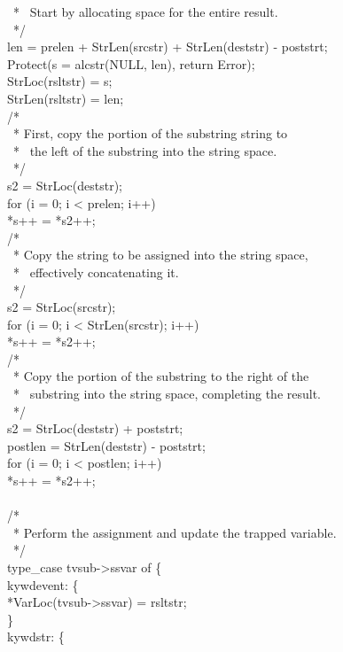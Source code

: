 {\>\ * \ Start by allocating space for the entire result.\\
\>\ */\\
\>len = prelen + StrLen(srcstr) + StrLen(deststr) - poststrt;\\
\>Protect(s = alcstr(NULL, len), return Error);\\
\>StrLoc(rsltstr) = s;\\
\>StrLen(rsltstr) = len;\\
\>/*\\
\>\ * First, copy the portion of the substring string to\\
\>\ * \ the left of the substring into the string space.\\
\>\ */\\
\>s2 = StrLoc(deststr);\\
\>for (i = 0; i < prelen; i++)\\
\>\>*s++ = *s2++;\\
\>/*\\
\>\ * Copy the string to be assigned into the string space,\\
\>\ * \ effectively concatenating it.\\
\>\ */\\
\>s2 = StrLoc(srcstr);\\
\>for (i = 0; i < StrLen(srcstr); i++)\\
\>\>*s++ = *s2++;\\
\>/*\\
\>\ * Copy the portion of the substring to the right of the\\
\>\ * \ substring into the string space, completing the result.\\
\>\ */\\
\>s2 = StrLoc(deststr) + poststrt;\\
\>postlen = StrLen(deststr) - poststrt;\\
\>for (i = 0; i < postlen; i++)\\
\>\>*s++ = *s2++;\\
\\
\>/*\\
\>\ * Perform the assignment and update the trapped variable.\\
\>\ */\\
\>type\_case tvsub->ssvar of \{\\
\>\>kywdevent: \{\\
\>\>\>*VarLoc(tvsub->ssvar) = rsltstr;\\
\>\>\>\}\\
\>\>kywdstr: \{\\
}
